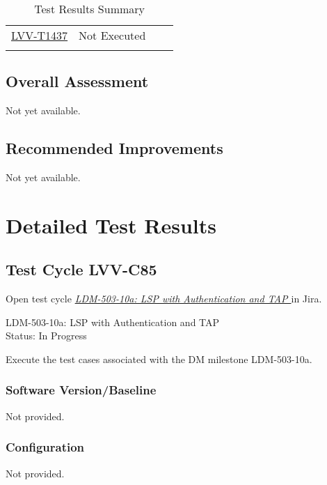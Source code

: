 \documentclass[DM,lsstdraft,STR,toc]{lsstdoc}
\begin{document}
\begin{longtable}{p{}p{}p{}p{}}
\begin{minipage}[]{0.56\textwidth}
    \medskip
    \end{minipage}
    &
    \\\hline
    \href{https://jira.lsstcorp.org/secure/Tests.jspa#/testCase/LVV-T1437}{LVV-T1437}
    & Not Executed &
    \begin{minipage}[]{0.56\textwidth}
    \smallskip
    
    \medskip
    \end{minipage}
    &
    \\\hline

\caption{Test Results Summary}
\label{table:summary}
\end{longtable}

\subsection{Overall Assessment}
\label{sect:overallassessment}

Not yet available.

\subsection{Recommended Improvements}
\label{sect:recommendations}

Not yet available.

\newpage
\section{Detailed Test Results}
\label{sect:detailedtestresults}


  \subsection{Test Cycle LVV-C85 }

Open test cycle {\it \href{https://jira.lsstcorp.org/secure/Tests.jspa#/testrun/LVV-C85}{LDM-503-10a: LSP with Authentication and TAP
}} in Jira.

  LDM-503-10a: LSP with Authentication and TAP
\\
  Status: In Progress

  Execute the test cases associated with the DM milestone LDM-503-10a.


  \subsubsection{Software Version/Baseline}
    Not provided.

  \subsubsection{Configuration}
    Not provided.
\end{document}
